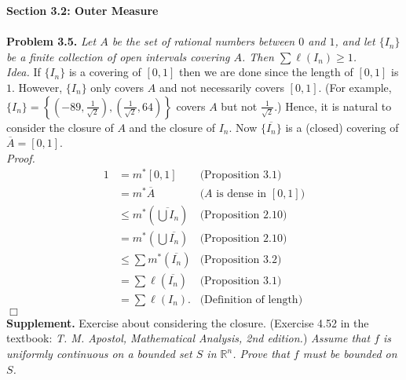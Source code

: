 \documentclass{article}
\begin{document}



\textbf{\large Section 3.2: Outer Measure} \\\\



\textbf{Problem 3.5.}
\emph{Let $A$ be the set of rational numbers between $0$ and $1$, and
let $\{ I_n\}$ be a finite collection of open intervals covering $A$.
Then $\sum \ell(I_n) \geq 1$.} \\



\emph{Idea.}
If $\{ I_n\}$ is a covering of $[0, 1]$ then we are done
since the length of $[0, 1]$ is $1$.
However, $\{ I_n\}$ only covers $A$ and not necessarily covers $[0, 1]$.
(For example,
$\{ I_n \}
= \left\{
\left( -89, \frac{1}{\sqrt{2}} \right),
\left( \frac{1}{\sqrt{2}}, 64 \right)
\right\}$ covers $A$ but not $\frac{1}{\sqrt{2}}$.)
Hence, it is natural to consider the closure of $A$ and
the closure of $I_n$.
Now $\{ \overline{I_n} \}$ is a (closed) covering of
$\overline{A} = [0, 1]$. \\



\emph{Proof.}
\begin{align*}
  1
  &= m^{*}[0, 1]
    &\text{(Proposition 3.1)} \\
  &= m^{*}\overline{A}
    &\text{($A$ is dense in $[0, 1]$)} \\
  &\leq m^{*}\left( \overline{\bigcup I_n} \right)
    &\text{(Proposition 2.10)} \\
  &= m^{*}\left( \bigcup \overline{I_n} \right)
    &\text{(Proposition 2.10)} \\
  &\leq \sum m^{*}(\overline{I_n})
    &\text{(Proposition 3.2)} \\
  &= \sum \ell(\overline{I_n})
    &\text{(Proposition 3.1)} \\
  &= \sum \ell(I_n).
    &\text{(Definition of length)}
  \end{align*}
$\Box$ \\



\textbf{Supplement.}
Exercise about considering the closure.
(Exercise 4.52  in the textbook: \emph{T. M. Apostol, Mathematical Analysis, 2nd edition.})
\emph{Assume that $f$ is uniformly continuous on a bounded set $S$ in $\mathbb{R}^n$.
Prove that $f$ must be bounded on $S$.} \\
\end{document}
